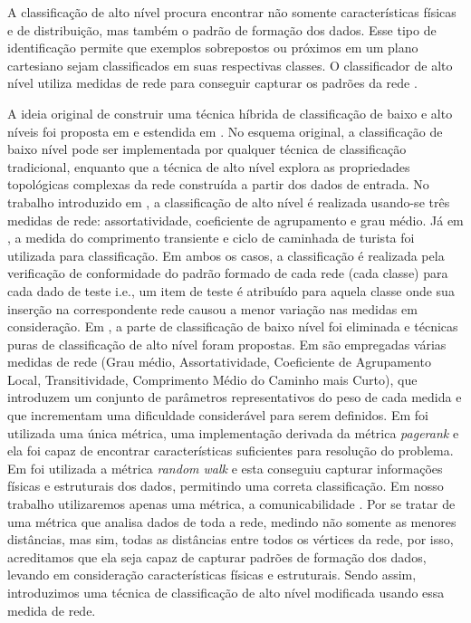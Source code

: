 \documentclass[
12pt,        %
oneside,     %
a4paper,     %
english,       %
brazil        %
%
%
]{ppgca}
\begin{document}
A classificação de alto nível procura encontrar não somente características físicas e de distribuição, mas também o padrão de formação dos dados. Esse tipo de identificação permite que exemplos sobrepostos ou próximos em um plano cartesiano sejam classificados em suas respectivas classes. O classificador de alto nível utiliza medidas de rede para conseguir capturar os padrões da rede \cite{silva2012a, Colliri2018, cupertino2017, CARNEIRO2019}.

A ideia original de construir uma técnica híbrida de classificação de baixo e alto níveis foi proposta em \cite{silva2012a, silva2015} e estendida em \cite{carneirozhao2018, Colliri2018, carneiro2014, carneiro2016, covoes2017, cupertino2017, CARNEIRO2019}. No esquema original, a classificação de baixo nível pode ser implementada por qualquer técnica de classificação tradicional, enquanto que a técnica de alto nível explora as propriedades topológicas complexas da rede construída a partir dos dados de entrada. No trabalho introduzido em \cite{silva2012a}, a classificação de alto nível é realizada usando-se três medidas de rede: assortatividade, coeficiente de agrupamento e grau médio. Já em \cite{silva2015}, a medida do comprimento transiente e ciclo de caminhada de turista foi utilizada para classificação. Em ambos os casos, a classificação é realizada pela verificação de conformidade do padrão formado de cada rede (cada classe) para cada dado de teste i.e., um item de teste é atribuído para aquela classe onde sua inserção na correspondente rede causou a menor variação nas medidas em consideração. Em \cite{carneirozhao2018, Colliri2018, cupertino2017}, a parte de classificação de baixo nível foi eliminada e técnicas puras de classificação de alto nível foram propostas. Em \cite{Colliri2018} são empregadas várias medidas de rede (Grau médio, Assortatividade, Coeficiente de Agrupamento Local, Transitividade, Comprimento Médio do Caminho mais Curto), que introduzem um conjunto de parâmetros representativos do peso de cada medida e que incrementam uma dificuldade considerável para serem definidos. Em \cite{carneirozhao2018} foi utilizada uma única métrica,  uma implementação derivada da métrica \textit{pagerank} e ela foi capaz de encontrar características suficientes para resolução do problema. Em \cite{cupertino2017} foi utilizada a métrica \textit{random walk} e esta conseguiu capturar informações físicas e estruturais dos dados, permitindo uma correta classificação. Em nosso trabalho utilizaremos apenas uma métrica, a comunicabilidade \cite{Estrada2008}. Por se tratar de uma métrica que analisa dados de toda a rede, medindo não somente as menores distâncias, mas sim, todas as distâncias entre todos os vértices da rede, por isso, acreditamos que ela seja capaz de capturar padrões de formação dos dados, levando em consideração características físicas e estruturais. Sendo assim, introduzimos uma técnica de classificação de alto nível modificada usando essa medida de rede.
\end{document}
